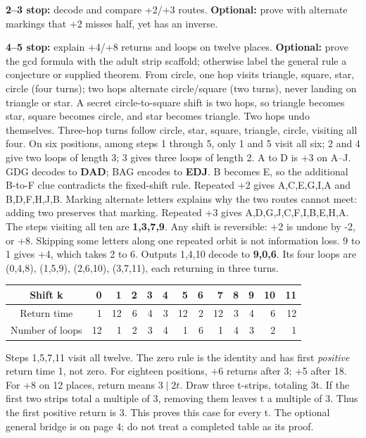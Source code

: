 \documentclass[12pt]{extarticle}
\begin{document}
\textbf{2--3 stop:} decode and compare +2/+3 routes. \textbf{Optional:} prove with alternate markings that +2 misses half, yet has an inverse.\par
\textbf{4--5 stop:} explain +4/+8 returns and loops on twelve places. \textbf{Optional:} prove the gcd formula with the adult strip scaffold; otherwise label the general rule a conjecture or supplied theorem.
\newpage
{}
From circle, one hop visits triangle, square, star, circle (four turns); two hops alternate circle/square (two turns), never landing on triangle or star. A secret circle-to-square shift is two hops, so triangle becomes star, square becomes circle, and star becomes triangle. Two hops undo themselves. Three-hop turns follow circle, star, square, triangle, circle, visiting all four. On six positions, among steps 1 through 5, only 1 and 5 visit all six; 2 and 4 give two loops of length 3; 3 gives three loops of length 2.
A to D is +3 on A--J. GDG decodes to \textbf{DAD}; BAG encodes to \textbf{EDJ}. B becomes E, so the additional B-to-F clue contradicts the fixed-shift rule. Repeated +2 gives A,C,E,G,I,A and B,D,F,H,J,B. Marking alternate letters explains why the two routes cannot meet: adding two preserves that marking. Repeated +3 gives A,D,G,J,C,F,I,B,E,H,A. The steps visiting all ten are \textbf{1,3,7,9}. Any shift is reversible: +2 is undone by -2, or +8. Skipping some letters along one repeated orbit is not information loss.
9 to 1 gives +4, which takes 2 to 6. Outputs 1,4,10 decode to \textbf{9,0,6}. Its four loops are (0,4,8), (1,5,9), (2,6,10), (3,7,11), each returning in three turns.
\begin{center}\renewcommand{\arraystretch}{1.25}\begin{tabular}{c|rrrrrrrrrrrr}Shift k&0&1&2&3&4&5&6&7&8&9&10&11\\\hline Return time&1&12&6&4&3&12&2&12&3&4&6&12\\Number of loops&12&1&2&3&4&1&6&1&4&3&2&1\end{tabular}\end{center}
Steps 1,5,7,11 visit all twelve. The zero rule is the identity and has first \emph{positive} return time 1, not zero. For eighteen positions, +6 returns after 3; +5 after 18.
For +8 on 12 places, return means \(3\mid2t\). Draw three t-strips, totaling 3t. If the first two strips total a multiple of 3, removing them leaves t a multiple of 3. Thus the first positive return is 3. This proves this case for every t. The optional general bridge is on page 4; do not treat a completed table as its proof.
\end{document}
